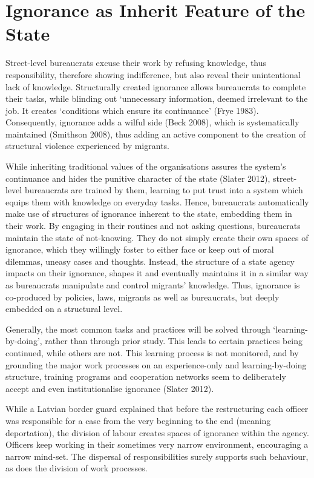 \section{Ignorance as Inherit Feature of the State}
Street-level bureaucrats excuse their work by refusing knowledge, thus responsibility, therefore showing indifference, but also reveal their unintentional lack of knowledge. Structurally created ignorance allows bureaucrats to complete their tasks, while blinding out ‘unnecessary information, deemed irrelevant to the job.  It creates ‘conditions which ensure its continuance’ (Frye 1983). Consequently, ignorance adds a wilful side (Beck 2008), which is systematically maintained (Smithson 2008), thus adding an active component to the creation of structural violence experienced by migrants.
\par
While inheriting traditional values of the organisations assures the system’s continuance and hides the punitive character of the state (Slater 2012), street-level bureaucrats are trained by them, learning to put trust into a system which equips them with knowledge on everyday tasks. Hence, bureaucrats automatically make use of structures of ignorance inherent to the state, embedding them in their work. By engaging in their routines and not asking questions, bureaucrats maintain the state of not-knowing. They do not simply create their own spaces of ignorance, which they willingly foster to either face or keep out of moral dilemmas, uneasy cases and thoughts. Instead, the structure of a state agency impacts on their ignorance, shapes it and eventually maintains it in a similar way as bureaucrats manipulate and control migrants’ knowledge. Thus, ignorance is co-produced by policies, laws, migrants as well as bureaucrats, but deeply embedded on a structural level.
\par
Generally, the most common tasks and practices will be solved through ‘learning-by-doing’, rather than through prior study. This leads to certain practices being continued, while others are not. This learning process is not monitored, and by grounding the major work processes on an experience-only and learning-by-doing structure, training programs and cooperation networks seem to deliberately accept and even institutionalise ignorance (Slater 2012).
\par
While a Latvian border guard explained that before the restructuring each officer was responsible for a case from the very beginning to the end (meaning deportation), the division of labour creates spaces of ignorance within the agency. Officers keep working in their sometimes very narrow environment, encouraging a narrow mind-set. The dispersal of responsibilities surely supports such behaviour, as does the division of work processes.
